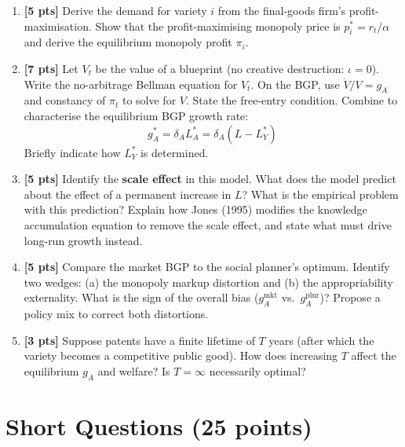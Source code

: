 \documentclass[a4paper,11pt]{article}
\begin{document}
\bigskip
\begin{enumerate}[label=\textbf{(\arabic*)},leftmargin=*]

\item \textbf{[5 pts]}
Derive the demand for variety $i$ from the final-goods firm's profit-maximisation. Show that the profit-maximising monopoly price is $p_i^* = r_t/\alpha$ and derive the equilibrium monopoly profit $\pi_i$.

\item \textbf{[7 pts]}
Let $V_t$ be the value of a blueprint (no creative destruction: $\iota = 0$). Write the no-arbitrage Bellman equation for $V_t$. On the BGP, use $\dot{V}/V = g_A$ and constancy of $\pi_t$ to solve for $V$. State the free-entry condition. Combine to characterise the equilibrium BGP growth rate:
\[
  g_A^* = \delta_A L_A^* = \delta_A(L - L_Y^*)
\]
Briefly indicate how $L_Y^*$ is determined.

\item \textbf{[5 pts]}
Identify the \textbf{scale effect} in this model. What does the model predict about the effect of a permanent increase in $L$? What is the empirical problem with this prediction? Explain how Jones (1995) modifies the knowledge accumulation equation to remove the scale effect, and state what must drive long-run growth instead.

\item \textbf{[5 pts]}
Compare the market BGP to the social planner's optimum. Identify two wedges: (a) the monopoly markup distortion and (b) the appropriability externality. What is the sign of the overall bias ($g_A^{\mathrm{mkt}}$ vs.\ $g_A^{\mathrm{plnr}}$)? Propose a policy mix to correct both distortions.

\item \textbf{[3 pts]}
Suppose patents have a finite lifetime of $T$ years (after which the variety becomes a competitive public good). How does increasing $T$ affect the equilibrium $g_A$ and welfare? Is $T = \infty$ necessarily optimal?

\end{enumerate}

\clearpage

\section*{Short Questions \hfill (25 points)}
\end{document}
